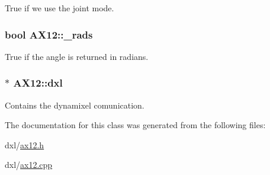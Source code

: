 True if we use the joint mode. 

\hypertarget{class_a_x12_aba71492043d7a3226f0793db57372bec}{}
\subsubsection[{\+\_\+rads}]{\setlength{\rightskip}{0pt plus 5cm}bool A\+X12\+::\+\_\+rads\hspace{0.3cm}{\ttfamily [private]}}\label{class_a_x12_aba71492043d7a3226f0793db57372bec}


True if the angle is returned in radians. 

\hypertarget{class_a_x12_af48e370f92f69214a27618d5b69bcfe8}{}
\subsubsection[{dxl}]{$\ast$ A\+X12\+::dxl\hspace{0.3cm}{\ttfamily [private]}}\label{class_a_x12_af48e370f92f69214a27618d5b69bcfe8}


Contains the dynamixel comunication. 



The documentation for this class was generated from the following files\+:\begin{DoxyCompactItemize}
\item 
dxl/\hyperlink{ax12_8h}{ax12.\+h}\item 
dxl/\hyperlink{ax12_8cpp}{ax12.\+cpp}\end{DoxyCompactItemize}
